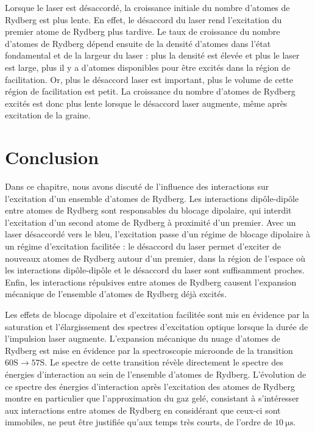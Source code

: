 Lorsque le laser est désaccordé, la croissance initiale du nombre d'atomes de Rydberg est plus lente.
En effet, le désaccord du laser rend l'excitation du premier atome de Rydberg plus tardive.
Le taux de croissance du nombre d'atomes de Rydberg dépend ensuite de la densité d'atomes dans l'état fondamental et de la largeur du laser : plus la densité est élevée et plus le laser est large, plus il y a d'atomes disponibles pour être excités dans la région de facilitation.
Or, plus le désaccord laser est important, plus le volume de cette région de facilitation est petit.
La croissance du nombre d'atomes de Rydberg excités est donc plus lente lorsque le désaccord laser augmente, même après excitation de la graine.

\clearpage
\section*{Conclusion}
\noindent Dans ce chapitre, nous avons discuté de l'influence des interactions sur l'excitation d'un ensemble d'atomes de Rydberg.
Les interactions dipôle-dipôle entre atomes de Rydberg sont responsables du blocage dipolaire, qui interdit l'excitation d'un second atome de Rydberg à proximité d'un premier.
Avec un laser désaccordé vers le bleu, l'excitation passe d'un régime de blocage dipolaire à un régime d'excitation facilitée : le désaccord du laser permet d'exciter de nouveaux atomes de Rydberg autour d'un premier, dans la région de l'espace où les interactions dipôle-dipôle et le désaccord du laser sont suffisamment proches.
Enfin, les interactions répulsives entre atomes de Rydberg causent l'expansion mécanique de l'ensemble d'atomes de Rydberg déjà excités.

Les effets de blocage dipolaire et d'excitation facilitée sont mis en évidence par la saturation et l'élargissement des spectres d'excitation optique lorsque la durée de l'impulsion laser augmente.
L'expansion mécanique du nuage d'atomes de Rydberg est mise en évidence par la spectroscopie microonde de la transition $\mathrm{60S}\rightarrow\mathrm{57S}$.
Le spectre de cette transition révèle directement le spectre des énergies d'interaction au sein de l'ensemble d'atomes de Rydberg.
L'évolution de ce spectre des énergies d'interaction après l'excitation des atomes de Rydberg montre en particulier que l'approximation du gaz gelé, consistant à s'intéresser aux interactions entre atomes de Rydberg en considérant que ceux-ci sont immobiles, ne peut être justifiée qu'aux temps très courts, de l'ordre de $\SI{10}{\us}$.


